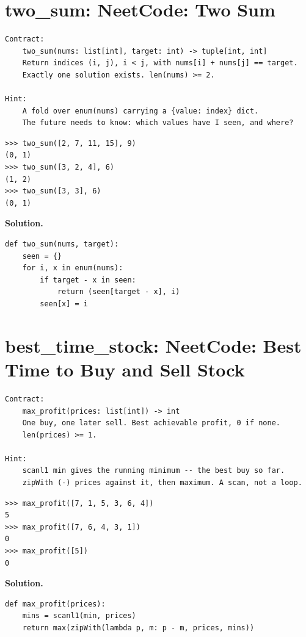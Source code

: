 \documentclass[10pt,letterpaper]{book}
\begin{document}
\section{two\_sum: NeetCode: Two Sum}
\begin{lstlisting}[style=ex]
Contract:
    two_sum(nums: list[int], target: int) -> tuple[int, int]
    Return indices (i, j), i < j, with nums[i] + nums[j] == target.
    Exactly one solution exists. len(nums) >= 2.

Hint:
    A fold over enum(nums) carrying a {value: index} dict.
    The future needs to know: which values have I seen, and where?
\end{lstlisting}
\begin{lstlisting}[style=ex]
>>> two_sum([2, 7, 11, 15], 9)
(0, 1)
>>> two_sum([3, 2, 4], 6)
(1, 2)
>>> two_sum([3, 3], 6)
(0, 1)
\end{lstlisting}
\noindent\textbf{Solution.}
\begin{lstlisting}[style=code]
def two_sum(nums, target):
    seen = {}
    for i, x in enum(nums):
        if target - x in seen:
            return (seen[target - x], i)
        seen[x] = i
\end{lstlisting}

\section{best\_time\_stock: NeetCode: Best Time to Buy and Sell Stock}
\begin{lstlisting}[style=ex]
Contract:
    max_profit(prices: list[int]) -> int
    One buy, one later sell. Best achievable profit, 0 if none.
    len(prices) >= 1.

Hint:
    scanl1 min gives the running minimum -- the best buy so far.
    zipWith (-) prices against it, then maximum. A scan, not a loop.
\end{lstlisting}
\begin{lstlisting}[style=ex]
>>> max_profit([7, 1, 5, 3, 6, 4])
5
>>> max_profit([7, 6, 4, 3, 1])
0
>>> max_profit([5])
0
\end{lstlisting}
\noindent\textbf{Solution.}
\begin{lstlisting}[style=code]
def max_profit(prices):
    mins = scanl1(min, prices)
    return max(zipWith(lambda p, m: p - m, prices, mins))
\end{lstlisting}
\end{document}
